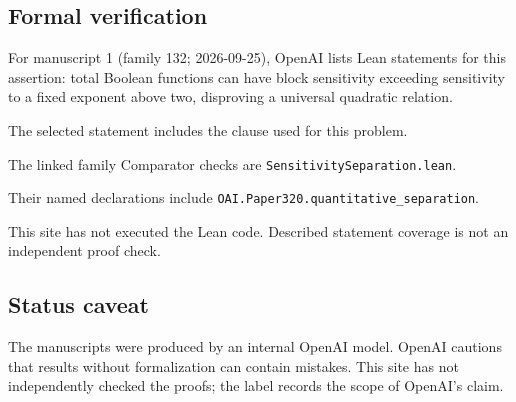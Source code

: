\documentclass[11pt]{article}
\begin{document}
\subsection{Formal verification}
For manuscript 1 (family 132; 2026-09-25), OpenAI lists Lean statements for this assertion: total Boolean functions can have block sensitivity exceeding sensitivity to a fixed exponent above two, disproving a universal quadratic relation.

The selected statement includes the clause used for this problem.

The linked family Comparator checks are \texttt{SensitivitySeparation.lean}.

Their named declarations include \texttt{OAI.Paper320.quantitative\_separation}.

This site has not executed the Lean code. Described statement coverage is not an independent proof check.

\subsection{Status caveat}
The manuscripts were produced by an internal OpenAI model. OpenAI cautions that results without formalization can contain mistakes. This site has not independently checked the proofs; the label records the scope of OpenAI's claim.
\end{document}
